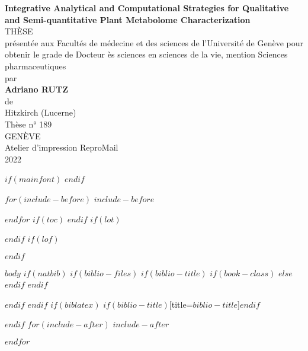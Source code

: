 \documentclass[$if(fontsize)$$fontsize$,$endif$$if(lang)$$lang$,$endif$$if(papersize)$$papersize$,$endif$$for(classoption)$$classoption$$sep$,$endfor$]{$documentclass$}
\begin{document}
\setmainfont{Arial}
\pagestyle{fancy}
\thispagestyle{firstpage}
\begin{center}
\singlespacing
\vspace*{0.5cm}
\Large
\textbf{Integrative Analytical and Computational Strategies for Qualitative and Semi-quantitative Plant Metabolome Characterization}\\
\vspace{2.0cm}
{THÈSE}\\
\vspace{2.0cm}
\large
{présentée aux Facultés de médecine et des sciences de l'Université de Genève pour obtenir le grade de Docteur ès sciences en sciences de la vie, mention Sciences pharmaceutiques}\\
\vspace{2.0cm}
{par}\\
\vspace{0.25cm}
\textbf{Adriano RUTZ}\\
\vspace{0.25cm}
{de}\\
\vspace{0.25cm}
{Hitzkirch (Lucerne)}\\
\vspace{2.0cm}
{Thèse n° 189}\\
\vspace{2.0cm}
{GENÈVE}\\
\vspace{0.25cm}
{Atelier d’impression ReproMail}\\
\vspace{0.25cm}
{2022}
\end{center}
$if(mainfont)$
    \setmainfont{$mainfont$}
$endif$

$for(include-before)$
$include-before$

$endfor$
$if(toc)$
{
\setcounter{tocdepth}{$toc-depth$}
\tableofcontents
}
$endif$
$if(lot)$
\listoftables
$endif$
$if(lof)$
\listoffigures
$endif$

$body$
$if(natbib)$
$if(biblio-files)$
$if(biblio-title)$
$if(book-class)$
\renewcommand\bibname{$biblio-title$}
$else$
\renewcommand\refname{$biblio-title$}
$endif$
$endif$


$endif$
$endif$
$if(biblatex)$
\printbibliography$if(biblio-title)$[title=$biblio-title$]$endif$

$endif$
$for(include-after)$
$include-after$

$endfor$
\end{document}
